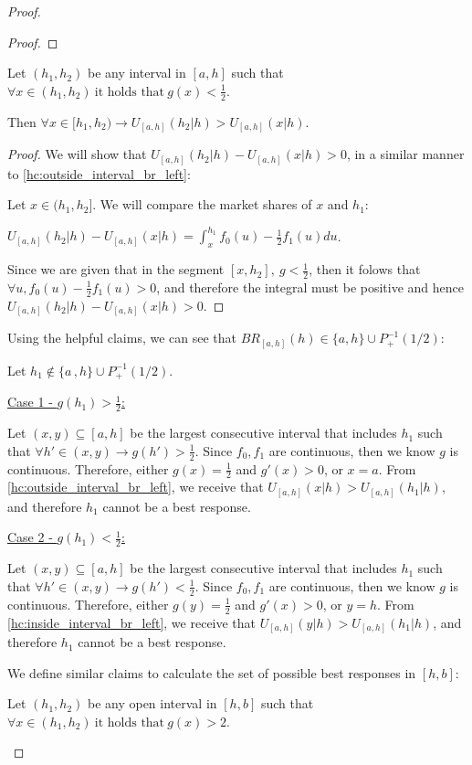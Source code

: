 \begin{proof}
\begin{proof}
 \end{proof}
\begin{helpful_claim}
\label{hc:inside_interval_br_left}
    Let $(h_1, h_2)$ be any interval in $[a,h]$ such that $\forall x \in (h_1,h_2) \ \text{it holds that} \ g(x) < \frac{1}{2}$.
        
    Then $\forall x \in [h_1, h_2) \to U_{[a,h]}(h_2|h) > U_{[a,h]}(x|h)$.
\end{helpful_claim}
\begin{proof}
     We will show that $U_{[a,h]}(h_2|h) - U_{[a,h]}(x|h) > 0$, in a similar manner to \cref{hc:outside_interval_br_left}:
     
    Let  $x \in (h_1, h_2]$.
    We will compare the market shares of $x$ and $h_1$:

     $U_{[a,h]}(h_2|h) - U_{[a,h]}(x|h) = \int_{x}^{h_1} f_0(u) - \frac{1}{2}f_1(u) du$.

    Since we are given that in the segment $[x,h_2], \ g < \frac{1}{2}$, then it folows that $\forall u, f_0(u) - \frac{1}{2}f_1(u) > 0$, and therefore the integral must be positive and hence $U_{[a,h]}(h_2|h) - U_{[a,h]}(x|h) > 0$.
     
\end{proof}
Using the helpful claims, we can see that $BR_{[a,h]}(h) \in \{a,h\} \cup  P_+^{-1}(1/2)$:

Let $h_1 \notin \{a\, , h\} \cup  P_+^{-1}(1/2)$.

\underline{Case 1 - $g(h_1) > \frac{1}{2}$:}

Let $(x,y) \subseteq [a,h]$ be the largest consecutive interval that includes $h_1$ such that $\forall h' \in (x,y) \to g(h') > \frac{1}{2}$.
Since $f_0,f_1$ are continuous, then we know $g$ is continuous.
Therefore, either $g(x) = \frac{1}{2}$ and $g'(x)>0$, or $x = a$.
From \cref{hc:outside_interval_br_left}, we receive that $U_{[a,h]}(x|h) > U_{[a,h]}(h_1|h)$, and therefore $h_1$ cannot be a best response.

\underline{Case 2 - $g(h_1) < \frac{1}{2}$:}

Let $(x,y) \subseteq [a,h]$ be the largest consecutive interval that includes $h_1$ such that $\forall h' \in (x,y) \to g(h') < \frac{1}{2}$.
Since $f_0,f_1$ are continuous, then we know $g$ is continuous.
Therefore, either $g(y) = \frac{1}{2}$ and $g'(x)>0$, or $y = h$.
From \cref{hc:inside_interval_br_left}, we receive that $U_{[a,h]}(y|h) > U_{[a,h]}(h_1|h)$, and therefore $h_1$ cannot be a best response.


We define similar claims to calculate the set of possible best responses in $[h,b]$:
\begin{helpful_claim}
\label{hc:outside_interval_br_right}
    Let $(h_1, h_2)$ be any open interval in $[h,b]$ such that $\forall x \in (h_1,h_2) \ \text{it holds that} \ g(x) > 2$.
    

\end{helpful_claim}
\end{proof}
